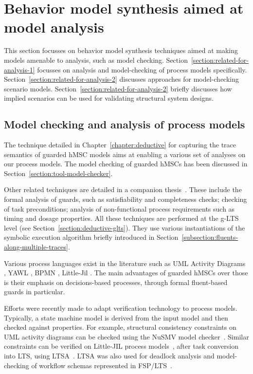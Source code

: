 \section{Behavior model synthesis aimed at model analysis\label{section:related-for-analysis}}

This section focusses on behavior model synthesis techniques aimed at making models amenable to analysis, such as model checking. Section~\ref{section:related-for-analysis-1} focusses on analysis and model-checking of process models specifically. Section~\ref{section:related-for-analysis-2} discusses approaches for model-checking scenario models. Section~\ref{section:related-for-analysis-2} briefly discusses how implied scenarios can be used for validating structural system designs.


\subsection{Model checking and analysis of process models\label{section:related-for-analysis-1}}

The technique detailed in Chapter~\ref{chapter:deductive} for capturing the trace semantics of guarded hMSC models aims at enabling a various set of analyses on our process models. The model checking of guarded hMSCs has been discussed in Section~\ref{section:tool-model-checker}. 

Other related techniques are detailed in a companion thesis~\cite{Damas:2011}. These include the formal analysis of guards, such as satisfiability and completeness checks; checking of task preconditions; analysis of non-functional process requirements such as timing and dosage properties. All these techniques are performed at the g-LTS level (see Section~\ref{section:deductive-glts}). They use various instantiations of the symbolic execution algorithm briefly introduced in Section~\ref{subsection:fluents-along-multiple-traces}.

Various process languages exist in the literature such as UML Activity Diagrams \cite{OMG:2004}, YAWL \cite{Vanderaalst:2005}, BPMN \cite{OMG:2008}, Little-Jil \cite{Clarke:2008}. The main advantages of guarded hMSCs over those is their emphasis on decisions-based processes, through formal fluent-based guards in particular.

Efforts were recently made to adapt verification technology to process models. Typically, a state machine model is derived from the input model and then checked against properties. For example, structural consistency constraints on UML activity diagrams can be checked using the NuSMV model checker~\cite{Eshuis:2006}. Similar constraints can be verified on Little-JIL process models~\cite{Lerner:2004}, after task conversion into LTS, using LTSA~\cite{Magee:1999}. LTSA was also used for deadlock analysis and model-checking of workflow schemas represented in FSP/LTS~\cite{Karamanolis:2000}.

